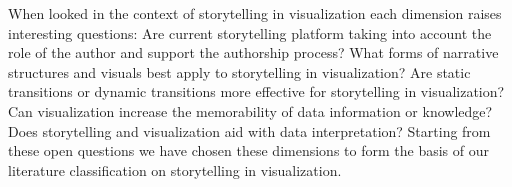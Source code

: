 \documentclass{egpubl}
\begin{document}
When looked in the context of storytelling in visualization each dimension raises interesting questions: Are current storytelling platform taking into account the role of the author and support the authorship process? What forms of narrative structures and visuals best apply to storytelling in visualization? Are static transitions or dynamic transitions more effective for storytelling in visualization? Can visualization increase the memorability of data information or knowledge? Does storytelling and visualization aid with data interpretation? 
Starting from these open questions we have chosen these dimensions to form the basis of our literature classification on storytelling in visualization. 

%
%	
\end{document}
